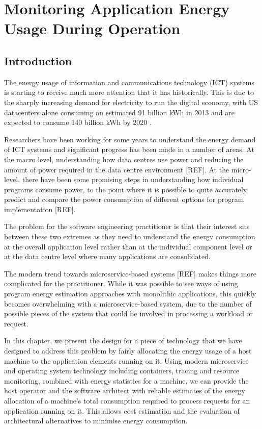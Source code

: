\chapter{Monitoring Application Energy Usage During Operation}



\section{Introduction}

The energy usage of information and communications technology (ICT) systems is starting to receive much more attention that it has historically.  This is due to the sharply increasing demand for electricity to run the digital economy, with US datacenters alone consuming an estimated 91 billion kWh in 2013 and are expected to consume 140 billion kWh by 2020 \cite{delforge2014-datacentreenergy}.

Researchers have been working for some years to understand the energy demand of ICT systems and significant progress has been made in a number of areas.  At the macro level, understanding how data centres use power and reducing the amount of power required in the data centre environment [REF].  At the micro-level, there have been some promising steps in understanding how individual programs consume power, to the point where it is possible to quite accurately predict and compare the power consumption of different options for program implementation [REF].

The problem for the software engineering practitioner is that their interest sits between these two extremes as they need to understand the energy consumption at the overall application level rather than at the individual component level or at the data centre level where many applications are consolidated.

The modern trend towards microservice-based systems [REF] makes things more complicated for the practitioner.  While it was possible to see ways of using program energy estimation approaches with monolithic applications, this quickly becomes overwhelming with a microservice-based system, due to the number of possible pieces of the system that could be involved in processing a workload or request.

In this chapter, we present the design for a piece of technology that we have designed to address this problem by fairly allocating the energy usage of a host machine to the application elements running on it.  Using modern microservice and operating system technology including containers, tracing and resource monitoring, combined with energy statistics for a machine, we can provide the host operator and the software architect with reliable estimates of the energy allocation of a machine's total consumption required to process requests for an application running on it.  This allows cost estimation and the evaluation of architectural alternatives to minimise energy consumption.


